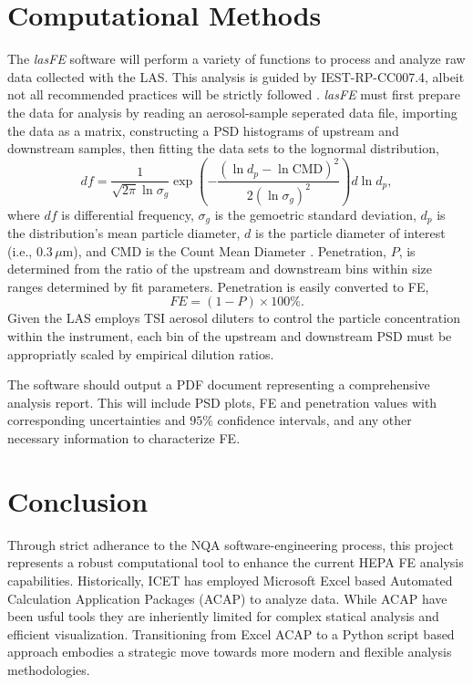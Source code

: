 \documentclass[aps,prl]{revtex4-2}
\begin{document}
\section{Computational Methods}
The \textit{lasFE} software will perform a variety of functions to process and analyze raw data collected with the LAS. This analysis is guided by IEST-RP-CC007.4, albeit not all recommended practices will be strictly followed \cite{iest}. \textit{lasFE} must first prepare the data for analysis by reading an aerosol-sample seperated data file, importing the data as a matrix, constructing a PSD histograms of upstream and downstream samples, then fitting the data sets to the lognormal distribution, 
\[df=\frac{1}{\sqrt{2\pi}\ln\sigma_g}\exp\left(-\frac{(\ln d_p - \ln \mathrm{CMD})^2}{2(\ln\sigma_g)^2}\right)d\ln d_p,\]
where $df$ is differential frequency, $\sigma_g$ is the gemoetric standard deviation, $d_p$ is the distribution's mean particle diameter, $d$ is the particle diameter of interest (i.e., $0.3\,\mu$m), and CMD is the Count Mean Diameter \cite{Hinds}. Penetration, $P$, is determined from the ratio of the upstream and downstream bins within size ranges determined by fit parameters. Penetration is easily converted to FE,
\[FE = (1-P) \times 100\%.\]
Given the LAS employs TSI aerosol diluters to control the particle concentration within the instrument, each bin of the upstream and downstream PSD must be appropriatly scaled by empirical dilution ratios.

The software should output a PDF document representing a comprehensive analysis report.  This will include PSD plots, FE and penetration values with corresponding uncertainties and $95\%$ confidence intervals, and any other necessary information to characterize FE.

\section{Conclusion}
Through strict adherance to the NQA software-engineering process, this project represents a robust computational tool to enhance the current HEPA FE analysis capabilities. Historically, ICET has employed Microsoft Excel based Automated Calculation Application Packages (ACAP) to analyze data. While ACAP have been usful tools they are inheriently limited for complex statical analysis and efficient visualization. Transitioning from Excel ACAP to a Python script based approach embodies a strategic move towards more modern and flexible analysis methodologies.



\end{document}
